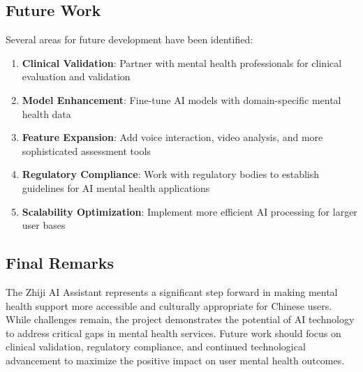 \subsection{Future Work}

Several areas for future development have been identified:

\begin{enumerate}
    \item \textbf{Clinical Validation}: Partner with mental health professionals for clinical evaluation and validation
    \item \textbf{Model Enhancement}: Fine-tune AI models with domain-specific mental health data
    \item \textbf{Feature Expansion}: Add voice interaction, video analysis, and more sophisticated assessment tools
    \item \textbf{Regulatory Compliance}: Work with regulatory bodies to establish guidelines for AI mental health applications
    \item \textbf{Scalability Optimization}: Implement more efficient AI processing for larger user bases
\end{enumerate}

\subsection{Final Remarks}

The Zhiji AI Assistant represents a significant step forward in making mental health support more accessible and culturally appropriate for Chinese users. While challenges remain, the project demonstrates the potential of AI technology to address critical gaps in mental health services. Future work should focus on clinical validation, regulatory compliance, and continued technological advancement to maximize the positive impact on user mental health outcomes. 